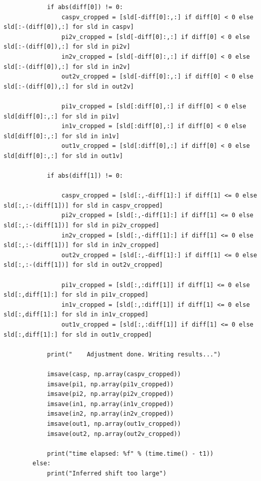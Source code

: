 \documentclass[pdftex,12pt,a4paper]{report}
\begin{document}
\begin{verbatim}
            if abs(diff[0]) != 0:
                caspv_cropped = [sld[-diff[0]:,:] if diff[0] < 0 else sld[:-(diff[0]),:] for sld in caspv]
                pi2v_cropped = [sld[-diff[0]:,:] if diff[0] < 0 else sld[:-(diff[0]),:] for sld in pi2v]
                in2v_cropped = [sld[-diff[0]:,:] if diff[0] < 0 else sld[:-(diff[0]),:] for sld in in2v]
                out2v_cropped = [sld[-diff[0]:,:] if diff[0] < 0 else sld[:-(diff[0]),:] for sld in out2v]
        
                pi1v_cropped = [sld[:diff[0],:] if diff[0] < 0 else sld[diff[0]:,:] for sld in pi1v]
                in1v_cropped = [sld[:diff[0],:] if diff[0] < 0 else sld[diff[0]:,:] for sld in in1v]
                out1v_cropped = [sld[:diff[0],:] if diff[0] < 0 else sld[diff[0]:,:] for sld in out1v]
            
            if abs(diff[1]) != 0:
        
                caspv_cropped = [sld[:,-diff[1]:] if diff[1] <= 0 else sld[:,:-(diff[1])] for sld in caspv_cropped]
                pi2v_cropped = [sld[:,-diff[1]:] if diff[1] <= 0 else sld[:,:-(diff[1])] for sld in pi2v_cropped]
                in2v_cropped = [sld[:,-diff[1]:] if diff[1] <= 0 else sld[:,:-(diff[1])] for sld in in2v_cropped]
                out2v_cropped = [sld[:,-diff[1]:] if diff[1] <= 0 else sld[:,:-(diff[1])] for sld in out2v_cropped]
        
                pi1v_cropped = [sld[:,:diff[1]] if diff[1] <= 0 else sld[:,diff[1]:] for sld in pi1v_cropped]
                in1v_cropped = [sld[:,:diff[1]] if diff[1] <= 0 else sld[:,diff[1]:] for sld in in1v_cropped]
                out1v_cropped = [sld[:,:diff[1]] if diff[1] <= 0 else sld[:,diff[1]:] for sld in out1v_cropped]

            print("    Adjustment done. Writing results...")

            imsave(casp, np.array(caspv_cropped))
            imsave(pi1, np.array(pi1v_cropped))
            imsave(pi2, np.array(pi2v_cropped))
            imsave(in1, np.array(in1v_cropped))
            imsave(in2, np.array(in2v_cropped))
            imsave(out1, np.array(out1v_cropped))
            imsave(out2, np.array(out2v_cropped))

            print("time elapsed: %f" % (time.time() - t1))
        else:
            print("Inferred shift too large")
\end{verbatim}
\end{document}
